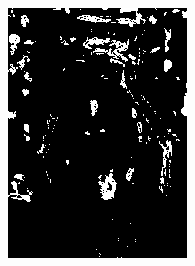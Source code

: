 \begin{figure}[h]
{\begin{subfigure}[b]{0.23\textwidth}
         \includegraphics[width=\textwidth]{images/results/cross/att-massu_ecu_sch_bayes.png}
     \end{subfigure}}
     

\end{figure}
